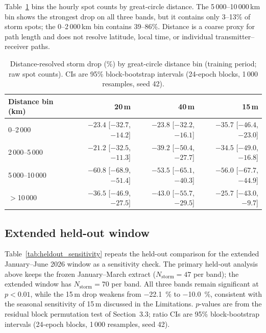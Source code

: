 \documentclass{agujournal2019}
\begin{document}
Table~\ref{tab:distance} bins the hourly spot counts by great-circle
distance. The 5\,000--10\,000\,km bin shows the strongest drop on all three
bands, but it contains only 3--13\% of storm spots; the 0--2\,000\,km bin
contains 39--86\%. Distance is a coarse proxy for path length and does not
resolve latitude, local time, or individual transmitter--receiver paths.

\begin{table}[h]
	\centering
	\small
	\caption{Distance-resolved storm drop (\%) by great-circle distance bin
		(training period; raw spot counts). CIs are 95\% block-bootstrap intervals
		(24-epoch blocks, 1\,000 resamples, seed 42).}
	\label{tab:distance}
	\begin{tabular}{lrrr}
		\toprule
		Distance bin (km) & 20\,m & 40\,m & 15\,m \\
		\midrule
		0--2\,000     & $-23.4$ [$-32.7$, $-14.2$]
		& $-23.8$ [$-32.2$, $-16.1$]
		& $-35.7$ [$-46.4$, $-23.0$] \\
		2\,000--5\,000 & $-21.2$ [$-32.5$, $-11.3$]
		& $-39.2$ [$-50.4$, $-27.7$]
		& $-34.5$ [$-49.0$, $-16.8$] \\
		5\,000--10\,000 & $-60.8$ [$-68.9$, $-51.4$]
		& $-53.5$ [$-65.1$, $-40.3$]
		& $-56.0$ [$-67.7$, $-44.9$] \\
		$>$10\,000    & $-36.5$ [$-46.9$, $-27.5$]
		& $-43.0$ [$-55.7$, $-29.5$]
		& $-25.7$ [$-43.0$, $-9.7$] \\
		\bottomrule
	\end{tabular}
\end{table}

\subsection{Extended held-out window}

Table~\ref{tab:heldout_sensitivity} repeats the held-out comparison for
the extended January--June 2026 window as a sensitivity check. The
primary held-out analysis above keeps the frozen January--March extract
($N_{\text{storm}} = 47$ per band); the extended window has
$N_{\text{storm}} = 70$ per band. All three bands remain significant at
$p < 0.01$, while the 15\,m drop weakens from \SI{-22.1}{\percent} to
\SI{-10.0}{\percent}, consistent with the seasonal sensitivity of 15\,m
discussed in the Limitations. $p$-values are from the residual block
permutation test of Section~3.3; ratio CIs are 95\% block-bootstrap
intervals (24-epoch blocks, 1\,000 resamples, seed 42).
\end{document}
